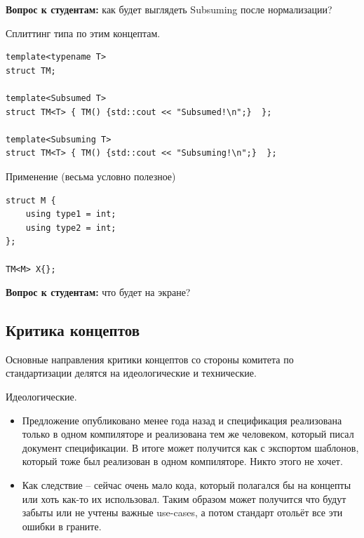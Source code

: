 \documentclass[a4paper,12pt,oneside]{book}
\newif\ifanswers
\begin{document}
\textbf{Вопрос к студентам:} как будет выглядеть Subsuming после нормализации?

\ifanswers
Ответ довольно очевиден:

\begin{lstlisting}
template<typename T>
concept bool Subsuming() {
    return requires () { typename T::type1; }
        && requires () { typename T::type2; };
}
\end{lstlisting}
\fi

Сплиттинг типа по этим концептам.

\begin{lstlisting}
template<typename T>
struct TM;

template<Subsumed T>
struct TM<T> { TM() {std::cout << "Subsumed!\n";}  };

template<Subsuming T>
struct TM<T> { TM() {std::cout << "Subsuming!\n";}  };
\end{lstlisting}

Применение (весьма условно полезное)

\begin{lstlisting}
struct M {
    using type1 = int;
    using type2 = int;
};

TM<M> X{};
\end{lstlisting}

\textbf{Вопрос к студентам:} что будет на экране?

\ifanswers
Разумеется на экране будет subsuming. Поглотивший констрейнт как более мощный имеет приоритет при разрешении перегрузки.
\fi

\subsection{Критика концептов}\label{WhyNotConstraints}

Основные направления критики концептов со стороны комитета по стандартизации делятся на идеологические и технические.

Идеологические.

\begin{itemize}
\item Предложение опубликовано менее года назад и спецификация реализована только в одном компиляторе и реализована тем же человеком, который писал документ спецификации. В итоге может получится как с экспортом шаблонов, который тоже был реализован в одном компиляторе. Никто этого не хочет.
\item Как следствие -- сейчас очень мало кода, который полагался бы на концепты или хоть как-то их использовал. Таким образом может получится что будут забыты или не учтены важные use-cases, а потом стандарт отольёт все эти ошибки в граните.
\end{itemize}
\end{document}

